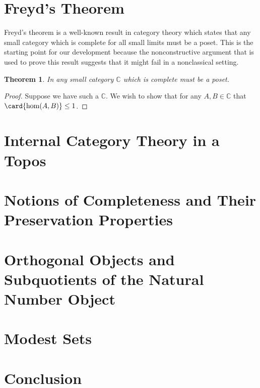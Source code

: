 \documentclass[12pt]{amsart}
\newcommand{\Ccat}{\ensuremath{\mathbb{C}}}
\newtheorem{thm}{Theorem}[section]
\begin{document}
\section{Freyd's Theorem}\label{sec:freyd}

Freyd's theorem is a well-known result in category theory which states
that any small category which is complete for all small limits must be
a poset. This is the starting point for our development because the
nonconstructive argument that is used to prove this result suggests
that it might fail in a nonclassical setting.
\begin{thm}\label{thm:freyd:freyd}
  In any small category $\Ccat$ which is complete must be a poset.
\end{thm}
\begin{proof}
  Suppose we have such a $\Ccat$. We wish to show that for any
  $A, B \in \Ccat$ that $\card{\hom(A, B)} \le 1$.
\end{proof}

\section{Internal Category Theory in a Topos}\label{sec:internal}
\section{Notions of Completeness and Their Preservation Properties}\label{sec:completeness}
\section{Orthogonal Objects and Subquotients of the Natural Number Object}\label{sec:orth}
\section{Modest Sets}\label{sec:modest}
\section{Conclusion}\label{sec:conclusion}


{}
\end{document}
